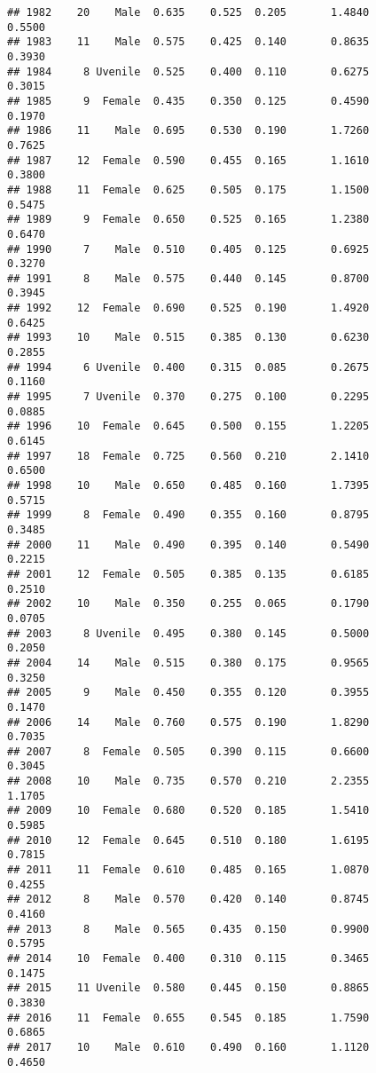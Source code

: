 \documentclass[
]{article}
\begin{document}
\begin{verbatim}
## 1982    20    Male  0.635    0.525  0.205       1.4840         0.5500
## 1983    11    Male  0.575    0.425  0.140       0.8635         0.3930
## 1984     8 Uvenile  0.525    0.400  0.110       0.6275         0.3015
## 1985     9  Female  0.435    0.350  0.125       0.4590         0.1970
## 1986    11    Male  0.695    0.530  0.190       1.7260         0.7625
## 1987    12  Female  0.590    0.455  0.165       1.1610         0.3800
## 1988    11  Female  0.625    0.505  0.175       1.1500         0.5475
## 1989     9  Female  0.650    0.525  0.165       1.2380         0.6470
## 1990     7    Male  0.510    0.405  0.125       0.6925         0.3270
## 1991     8    Male  0.575    0.440  0.145       0.8700         0.3945
## 1992    12  Female  0.690    0.525  0.190       1.4920         0.6425
## 1993    10    Male  0.515    0.385  0.130       0.6230         0.2855
## 1994     6 Uvenile  0.400    0.315  0.085       0.2675         0.1160
## 1995     7 Uvenile  0.370    0.275  0.100       0.2295         0.0885
## 1996    10  Female  0.645    0.500  0.155       1.2205         0.6145
## 1997    18  Female  0.725    0.560  0.210       2.1410         0.6500
## 1998    10    Male  0.650    0.485  0.160       1.7395         0.5715
## 1999     8  Female  0.490    0.355  0.160       0.8795         0.3485
## 2000    11    Male  0.490    0.395  0.140       0.5490         0.2215
## 2001    12  Female  0.505    0.385  0.135       0.6185         0.2510
## 2002    10    Male  0.350    0.255  0.065       0.1790         0.0705
## 2003     8 Uvenile  0.495    0.380  0.145       0.5000         0.2050
## 2004    14    Male  0.515    0.380  0.175       0.9565         0.3250
## 2005     9    Male  0.450    0.355  0.120       0.3955         0.1470
## 2006    14    Male  0.760    0.575  0.190       1.8290         0.7035
## 2007     8  Female  0.505    0.390  0.115       0.6600         0.3045
## 2008    10    Male  0.735    0.570  0.210       2.2355         1.1705
## 2009    10  Female  0.680    0.520  0.185       1.5410         0.5985
## 2010    12  Female  0.645    0.510  0.180       1.6195         0.7815
## 2011    11  Female  0.610    0.485  0.165       1.0870         0.4255
## 2012     8    Male  0.570    0.420  0.140       0.8745         0.4160
## 2013     8    Male  0.565    0.435  0.150       0.9900         0.5795
## 2014    10  Female  0.400    0.310  0.115       0.3465         0.1475
## 2015    11 Uvenile  0.580    0.445  0.150       0.8865         0.3830
## 2016    11  Female  0.655    0.545  0.185       1.7590         0.6865
## 2017    10    Male  0.610    0.490  0.160       1.1120         0.4650

\end{verbatim}
\end{document}
